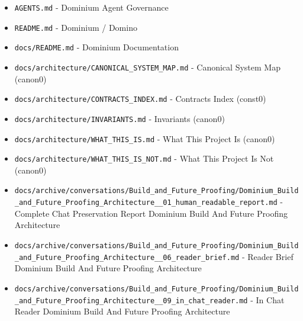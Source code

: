 \documentclass[10.5pt,a4paper,openany]{book}
\begin{document}
\begin{itemize}
\item \texttt{AGENTS.\allowbreak{}md} -\allowbreak{} Dominium Agent Governance
\item \texttt{README.\allowbreak{}md} -\allowbreak{} Dominium /\allowbreak{} Domino
\item \texttt{docs/\allowbreak{}README.\allowbreak{}md} -\allowbreak{} Dominium Documentation
\item \texttt{docs/\allowbreak{}architecture/\allowbreak{}CANONICAL\_\allowbreak{}SYSTEM\_\allowbreak{}MAP.\allowbreak{}md} -\allowbreak{} Canonical System Map (canon0)
\item \texttt{docs/\allowbreak{}architecture/\allowbreak{}CONTRACTS\_\allowbreak{}INDEX.\allowbreak{}md} -\allowbreak{} Contracts Index (const0)
\item \texttt{docs/\allowbreak{}architecture/\allowbreak{}INVARIANTS.\allowbreak{}md} -\allowbreak{} Invariants (canon0)
\item \texttt{docs/\allowbreak{}architecture/\allowbreak{}WHAT\_\allowbreak{}THIS\_\allowbreak{}IS.\allowbreak{}md} -\allowbreak{} What This Project Is (canon0)
\item \texttt{docs/\allowbreak{}architecture/\allowbreak{}WHAT\_\allowbreak{}THIS\_\allowbreak{}IS\_\allowbreak{}NOT.\allowbreak{}md} -\allowbreak{} What This Project Is Not (canon0)
\item \texttt{docs/\allowbreak{}archive/\allowbreak{}conversations/\allowbreak{}Build\_\allowbreak{}and\_\allowbreak{}Future\_\allowbreak{}Proofing/\allowbreak{}Dominium\_\allowbreak{}Build\_\allowbreak{}and\_\allowbreak{}Future\_\allowbreak{}Proofing\_\allowbreak{}Architecture\_\allowbreak{}\_\allowbreak{}01\_\allowbreak{}human\_\allowbreak{}readable\_\allowbreak{}report.\allowbreak{}md} -\allowbreak{} Complete Chat Preservation Report Dominium Build And Future Proofing Architecture
\item \texttt{docs/\allowbreak{}archive/\allowbreak{}conversations/\allowbreak{}Build\_\allowbreak{}and\_\allowbreak{}Future\_\allowbreak{}Proofing/\allowbreak{}Dominium\_\allowbreak{}Build\_\allowbreak{}and\_\allowbreak{}Future\_\allowbreak{}Proofing\_\allowbreak{}Architecture\_\allowbreak{}\_\allowbreak{}06\_\allowbreak{}reader\_\allowbreak{}brief.\allowbreak{}md} -\allowbreak{} Reader Brief Dominium Build And Future Proofing Architecture
\item \texttt{docs/\allowbreak{}archive/\allowbreak{}conversations/\allowbreak{}Build\_\allowbreak{}and\_\allowbreak{}Future\_\allowbreak{}Proofing/\allowbreak{}Dominium\_\allowbreak{}Build\_\allowbreak{}and\_\allowbreak{}Future\_\allowbreak{}Proofing\_\allowbreak{}Architecture\_\allowbreak{}\_\allowbreak{}09\_\allowbreak{}in\_\allowbreak{}chat\_\allowbreak{}reader.\allowbreak{}md} -\allowbreak{} In Chat Reader Dominium Build And Future Proofing Architecture

\end{itemize}
\end{document}
